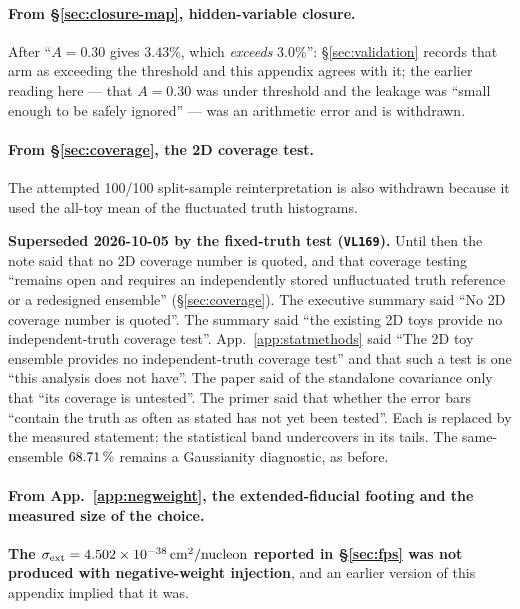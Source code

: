 \paragraph{From \S\ref{sec:closure-map}, hidden-variable closure.} After ``$A=0.30$ gives $3.43\%$, which \emph{exceeds} $3.0\%$'': \S\ref{sec:validation} records that arm as exceeding the threshold and this appendix agrees with it; the earlier reading here --- that $A=0.30$ was under threshold and the leakage was ``small enough to be safely ignored'' --- was an arithmetic error and is withdrawn.

\paragraph{From \S\ref{sec:coverage}, the 2D coverage test.} The attempted 100/100 split-sample reinterpretation is also withdrawn because it used the all-toy mean of the fluctuated truth histograms.

\textbf{Superseded 2026-10-05 by the fixed-truth test (\texttt{VL169}).} Until then the note said that no 2D coverage number is quoted, and that coverage testing ``remains open and requires an independently stored unfluctuated truth reference or a redesigned ensemble'' (\S\ref{sec:coverage}). The executive summary said ``No 2D coverage number is quoted''. The summary said ``the existing 2D toys provide no independent-truth coverage test''. App.~\ref{app:statmethods} said ``The 2D toy ensemble provides no independent-truth coverage test'' and that such a test is one ``this analysis does not have''. The paper said of the standalone covariance only that ``its coverage is untested''. The primer said that whether the error bars ``contain the truth as often as stated has not yet been tested''. Each is replaced by the measured statement: the statistical band undercovers in its tails. The same-ensemble $\SI{68.71}{\percent}$ remains a Gaussianity diagnostic, as before.

\paragraph{From App.~\ref{app:negweight}, the extended-fiducial footing and the measured size of the choice.} \textbf{The $\sigma_{\mathrm{ext}}=\SI{4.502e-38}{cm^2/nucleon}$ reported in \S\ref{sec:fps} was not produced with negative-weight injection}, and an earlier version of this appendix implied that it was.

